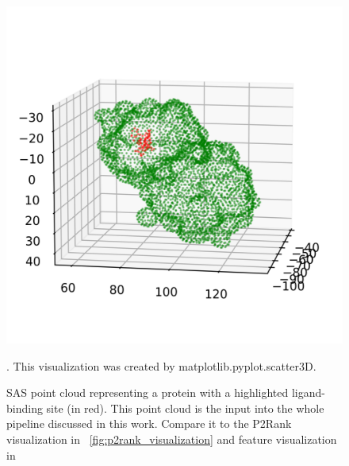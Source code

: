 \begin{figure}
    \centering
    \includegraphics[width=1\linewidth]{point_cloud_class.png}
    \caption{SAS point cloud representing a protein with a highlighted ligand-binding site (in red). This point cloud is the input into the whole pipeline discussed in this work. Compare it to the P2Rank visualization in ~\ref{fig:p2rank_visualization} and feature visualization in }
    \label{fig:class_point_cloud}. This visualization was created by matplotlib.pyplot.scatter3D.
\end{figure}

